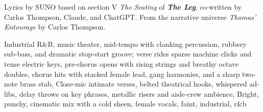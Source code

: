 
\begin{notes}
Lyrics by SUNO based on section V \emph{The Seating} of \emph{\bfseries The Leg}, %
co-written by Carlos Thompson, Claude, and ChatGPT. %
From the narrative universe \emph{Thomas’ Entourage} by Carlos Thompson.
\end{notes}
\begin{style}
Industrial R\&B, music theater, mid-tempo with clanking percussion, rubbery sub-bass, and dramatic stop-start groove; verse rides sparse machine clicks and tense electric keys, pre-chorus opens with rising strings and breathy octave doubles, chorus hits with stacked female lead, gang harmonies, and a sharp two-note brass stab, Close-mic intimate verses, belted theatrical hooks, whispered ad-libs, delay throws on key phrases, metallic risers and aisle-crew ambience, Bright, punchy, cinematic mix with a cold sheen, female vocals, faint, industrial, r\&b
\end{style}
